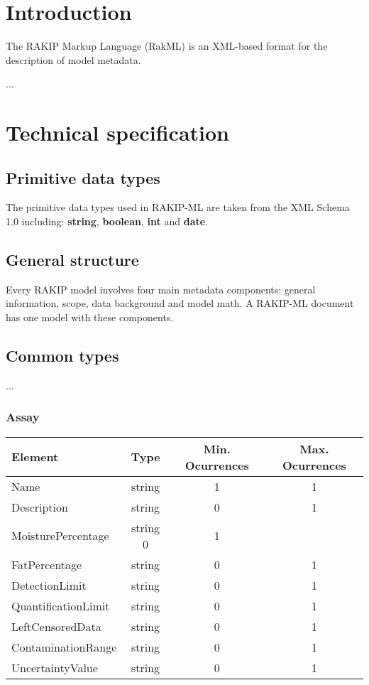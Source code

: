 \documentclass[a4paper]{report}
\newcommand{\booleantype}{\textbf{boolean}}
\newcommand{\stringtype}{\textbf{string}}
\begin{document}
\chapter{Introduction}

The RAKIP Markup Language (RakML) is an XML-based format for the description of model metadata.

...

\chapter{Technical specification}

\section{Primitive data types}
The primitive data types used in RAKIP-ML are taken from the XML Schema 1.0 including: \stringtype, \booleantype, \textbf{int} and \textbf{date}.

\section{General structure}
Every RAKIP model involves four main metadata components: general information, scope, data background and model math. A RAKIP-ML document has one model with these components.

\section{Common types}
...

\subsection{Assay}

\begin{tabular}{|l|c|c|c|}
    \hline
    \textbf{Element} & \textbf{Type} & \textbf{Min. Ocurrences} & \textbf{Max. Ocurrences} \\
    \hline
    Name & string & 1 & 1 \\
    Description & string & 0 & 1 \\
    MoisturePercentage & string 0 & 1 \\
    FatPercentage & string & 0 & 1 \\
    DetectionLimit & string & 0 & 1 \\
    QuantificationLimit & string & 0 & 1 \\
    LeftCensoredData & string & 0 & 1 \\
    ContaminationRange & string & 0 & 1 \\
    UncertaintyValue & string & 0 & 1 \\
    \hline
\end{tabular}
\end{document}
